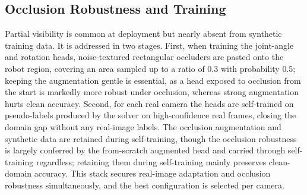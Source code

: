 \subsection{Occlusion Robustness and Training}
\label{sec:occlusion}

Partial visibility is common at deployment but nearly absent from synthetic training data. It is addressed in two stages. First, when training the joint-angle and rotation heads, noise-textured rectangular occluders are pasted onto the robot region, covering an area sampled up to a ratio of 0.3 with probability 0.5; keeping the augmentation gentle is essential, as a head exposed to occlusion from the start is markedly more robust under occlusion, whereas strong augmentation hurts clean accuracy. Second, for each real camera the heads are self-trained on pseudo-labels produced by the solver on high-confidence real frames, closing the domain gap without any real-image labels. The occlusion augmentation and synthetic data are retained during self-training, though the occlusion robustness is largely conferred by the from-scratch augmented head and carried through self-training regardless; retaining them during self-training mainly preserves clean-domain accuracy. This stack secures real-image adaptation and occlusion robustness simultaneously, and the best configuration is selected per camera.

